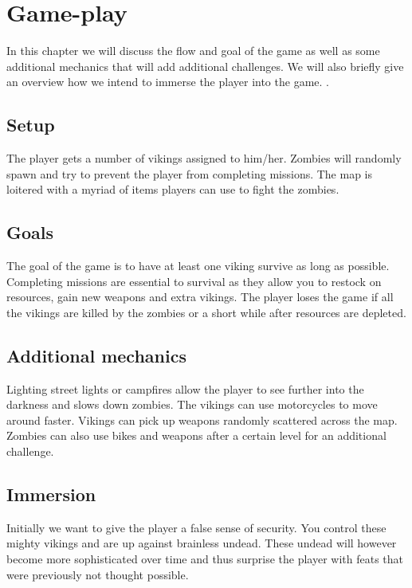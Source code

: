 \chapter{Game-play}

In this chapter we will discuss the flow and goal of the game as well as some additional mechanics that will add additional challenges. We will also briefly give an overview how we intend to immerse the player into the game.
.
\section{Setup}
The player gets a number of vikings assigned to him/her. Zombies will randomly spawn and try to prevent the player from completing missions.
The map is loitered with a myriad of items players can use to fight the zombies.

\section{Goals}
The goal of the game is to have at least one viking survive as long as possible. Completing missions are essential to survival as they allow you to restock on resources, gain new weapons and extra vikings.
The player loses the game if all the vikings are killed by the zombies or a short while after resources are depleted.

\section{Additional mechanics}
Lighting street lights or campfires allow the player to see further into the darkness and slows down zombies.
The vikings can use motorcycles to move around faster. 
Vikings can pick up weapons randomly scattered across the map. Zombies can also use bikes and weapons after a certain level for an additional challenge.

\section{Immersion}
Initially we want to give the player a false sense of security. You control these mighty vikings and are up against brainless undead. These undead will however become more sophisticated over time and thus surprise the player with feats that were previously not thought possible.